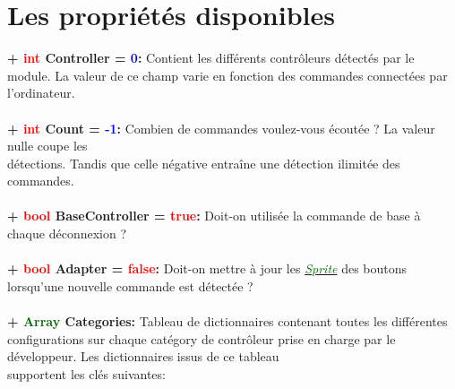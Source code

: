 \documentclass[a4paper, 11pt]{article}
\begin{document}
	\section{Les propriétés disponibles}
	\textbf{+ \textcolor{red}{int} Controller = \textcolor{blue}{0}:} Contient les différents contrôleurs 
	détectés par le module. La valeur de ce champ varie en fonction des commandes connectées par 
	l'ordinateur.
	\\\\
	\textbf{+ \textcolor{red}{int} \hypertarget{count}{Count} = \textcolor{blue}{-1}:} Combien de commandes 
	voulez-vous écoutée ? La valeur nulle coupe les \\détections. Tandis que celle négative entraîne une 
	détection ilimitée des commandes.\\\\
	\textbf{+ \textcolor{red}{bool} BaseController = \textcolor{red}{true}:} Doit-on utilisée la commande de 
	base à chaque déconnexion ?\\\\
	\textbf{+ \textcolor{red}{bool} Adapter = \textcolor{red}{false}:} Doit-on mettre à jour les
	\href{https://docs.godotengine.org/en/stable/classes/class_sprite.html}
	{\textit{\textcolor{darkgreen}{Sprite}}} des boutons lorsqu'une nouvelle commande est détectée ?\\\\
	\textbf{+ \textcolor{darkgreen}{Array} Categories:} Tableau de dictionnaires contenant toutes les 
	différentes configurations sur chaque catégory de contrôleur prise en charge par le développeur. Les 
	dictionnaires issus de ce tableau \\supportent les clés suivantes:\\
\end{document}
